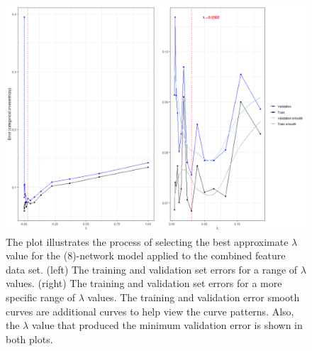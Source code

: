 \begin{figure}[]
	\begin{center}
		\includegraphics[scale = 0.5]{fig/CH3/all_mod_1_lambda_plot.png}
		\caption{The plot illustrates the process of selecting the best approximate $\lambda$ value for the (8)-network model applied to the combined feature data set. (left) The training and validation set errors for a range of $\lambda$ values. (right) The training and validation set errors for a more specific range of $\lambda$ values. The training and validation error smooth curves are additional curves to help view the curve patterns. Also, the $\lambda$ value that produced the minimum validation error is shown in both plots.}
		\label{fig:ch3_nn_validation_mod1_all}
	\end{center}	
\end{figure}

